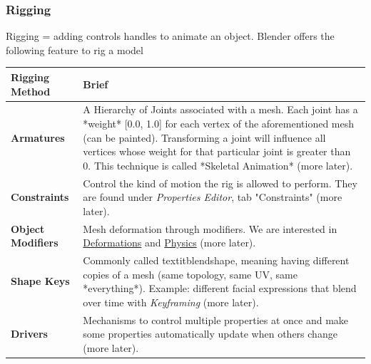 \documentclass{article}
\begin{document}
\subsubsection{Rigging}

Rigging = adding controls handles to animate an object. Blender offers the following feature to rig a model
\begin{longtable}{p{}p{}}
    \toprule
    \textbf{Rigging Method}   & \textbf{Brief}                                                                                                                                                                                                                                                                                                         \\
    \midrule
    \endhead
    \bottomrule
    \endfoot

    \textbf{Armatures}        & A Hierarchy of Joints associated with a mesh. Each joint has a *weight* [0.0, 1.0] for each vertex of the aforementioned mesh (can be painted). Transforming a joint will influence all vertices whose weight for that particular joint is greater than 0. This technique is called *Skeletal Animation* (more later). \\
    \textbf{Constraints}      & Control the kind of motion the rig is allowed to perform. They are found under \textit{Properties Editor}, tab "Constraints" (more later).                                                                                                                                                                             \\
    \textbf{Object Modifiers} & Mesh deformation through modifiers. We are interested in \href{https://docs.blender.org/manual/en/4.3/modeling/modifiers/deform/index.html}{Deformations} and \href{https://docs.blender.org/manual/en/4.3/modeling/modifiers/physics/index.html}{Physics} (more later).                                               \\
    \textbf{Shape Keys}       & Commonly called textit{blendshape}, meaning having different copies of a mesh (same topology, same UV, same *everything*). Example: different facial expressions that blend over time with \textit{Keyframing} (more later).                                                                                           \\
    \textbf{Drivers}          & Mechanisms to control multiple properties at once and make some properties automatically update when others change (more later).                                                                                                                                                                                       \\
\end{longtable}
\end{document}
